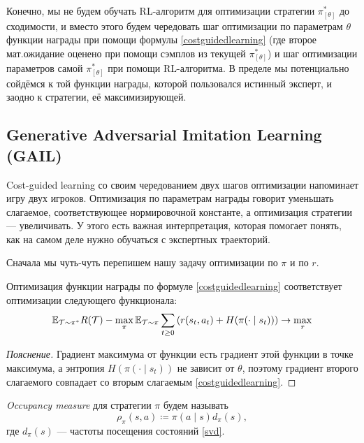Конечно, мы не будем обучать RL-алгоритм для оптимизации стратегии $\pi^*_{[\theta]}$ до сходимости, и вместо этого будем чередовать шаг оптимизации по параметрам $\theta$ функции награды при помощи формулы \eqref{costguidedlearning} (где второе мат.ожидание оценено при помощи сэмплов из текущей $\pi^*_{[\theta]}$) и шаг оптимизации параметров самой $\pi^*_{[\theta]}$ при помощи RL-алгоритма. В пределе мы потенциально сойдёмся к той функции награды, которой пользовался истинный эксперт, и заодно к стратегии, её максимизирующей.

\subsection{Generative Adversarial Imitation Learning (GAIL)}

Cost-guided learning со своим чередованием двух шагов оптимизации напоминает игру двух игроков. Оптимизация по параметрам награды говорит уменьшать слагаемое, соответствующее нормировочной константе, а оптимизация стратегии --- увеличивать. У этого есть важная интерпретация, которая помогает понять, как на самом деле нужно обучаться с экспертных траекторий.

Сначала мы чуть-чуть перепишем нашу задачу оптимизации по $\pi$ и по $r$.

\begin{proposition}
Оптимизация функции награды по формуле \eqref{costguidedlearning} соответствует оптимизации следующего функционала:
\begin{equation}\label{irl_dual}
\mathbb{E}_{\mathcal{T} \sim \pi^*} R(\mathcal{T}) - \max_{\pi} \mathbb{E}_{\mathcal{T} \sim \pi} \sum_{t \ge 0} \left( r(s_t, a_t) + H(\pi(\cdot \mid s_t)) \right) \to \max_{r}
\end{equation}
\begin{proof}[Пояснение]
Градиент максимума от функции есть градиент этой функции в точке максимума, а энтропия $H(\pi(\cdot \mid s_t))$ не зависит от $\theta$, поэтому градиент второго слагаемого совпадает со вторым слагаемым \eqref{costguidedlearning}.
\end{proof}
\end{proposition}

\begin{definition}
\emph{Occupancy measure} для стратегии $\pi$ будем называть
\begin{equation}\label{occupancymeasure}
\rho_\pi(s, a) \coloneqq \pi(a \mid s)d_{\pi}(s),
\end{equation}
где $d_\pi(s)$ --- частоты посещения состояний \eqref{svd}.
\end{definition}

